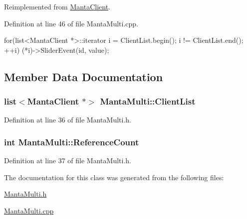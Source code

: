 \-Reimplemented from \hyperlink{classMantaClient_a89a4d91d04b59529cef6912db0f3c691}{\-Manta\-Client}.



\-Definition at line 46 of file \-Manta\-Multi.\-cpp.


\begin{DoxyCode}
{
   for(list<MantaClient *>::iterator i = ClientList.begin();
         i != ClientList.end(); ++i)
   {
      (*i)->SliderEvent(id, value);
   }
}
\end{DoxyCode}


\subsection{\-Member \-Data \-Documentation}
\hypertarget{classMantaMulti_aa1496399438a6043a3893ded1d1cb697}{
\subsubsection[{\-Client\-List}]{\setlength{\rightskip}{0pt plus 5cm}list$<${\bf \-Manta\-Client} $\ast$$>$ {\bf \-Manta\-Multi\-::\-Client\-List}}}\label{classMantaMulti_aa1496399438a6043a3893ded1d1cb697}


\-Definition at line 36 of file \-Manta\-Multi.\-h.

\hypertarget{classMantaMulti_a3686797c3b768fca3dd9e2fc55de05ee}{
\subsubsection[{\-Reference\-Count}]{\setlength{\rightskip}{0pt plus 5cm}int {\bf \-Manta\-Multi\-::\-Reference\-Count}}}\label{classMantaMulti_a3686797c3b768fca3dd9e2fc55de05ee}


\-Definition at line 37 of file \-Manta\-Multi.\-h.



\-The documentation for this class was generated from the following files\-:\begin{DoxyCompactItemize}
\item 
\hyperlink{MantaMulti_8h}{\-Manta\-Multi.\-h}\item 
\hyperlink{MantaMulti_8cpp}{\-Manta\-Multi.\-cpp}\end{DoxyCompactItemize}
